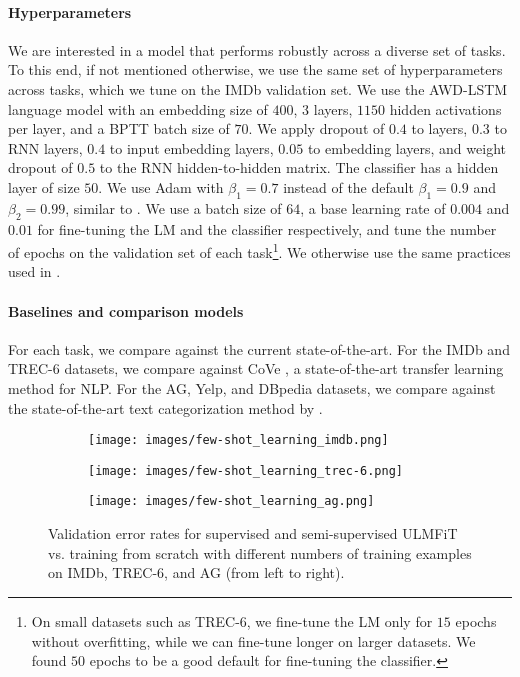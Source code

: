 \documentclass[11pt,a4paper]{article}
\begin{document}
\paragraph{Hyperparameters} We are interested in a model that performs robustly across a diverse set of tasks. To this end, if not mentioned otherwise, we use the same set of hyperparameters across tasks, which we tune on the IMDb validation set. We use the AWD-LSTM language model \cite{Merity2017} with an embedding size of $400$, $3$ layers, $1150$ hidden activations per layer, and a BPTT batch size of $70$. We apply dropout of $0.4$ to layers, $0.3$ to RNN layers, $0.4$ to input embedding layers, $0.05$ to embedding layers, and weight dropout of $0.5$ to the RNN hidden-to-hidden matrix. The classifier has a hidden layer of size $50$. We use Adam with $\beta_1=0.7$ instead of the default $\beta_1=0.9$ and $\beta_2 = 0.99$, similar to \cite{Dozat2017}. We use a batch size of $64$, a base learning rate of $0.004$ and $0.01$ for fine-tuning the LM and the classifier respectively, and tune the number of epochs on the validation set of each task\footnote{On small datasets such as TREC-6, we fine-tune the LM only for $15$ epochs without overfitting, while we can fine-tune longer on larger datasets. We found $50$ epochs to be a good default for fine-tuning the classifier.}. We otherwise use the same practices used in \cite{Merity2017}.

\paragraph{Baselines and comparison models} For each task, we compare against the current state-of-the-art. For the IMDb and TREC-6 datasets, we compare against CoVe \cite{Mccann2017}, a state-of-the-art transfer learning method for NLP. For the AG, Yelp, and DBpedia datasets, we compare against the state-of-the-art text categorization method by .

\begin{figure*}[!htb]
    \begin{subfigure}{.31\linewidth}
      \centering
         \texttt{[image: images/few-shot\_learning\_imdb.png]}
    \end{subfigure}\hspace*{0.3cm}
    \begin{subfigure}{.31\linewidth}
      \centering
         \texttt{[image: images/few-shot\_learning\_trec-6.png]}
    \end{subfigure}
    \hspace*{0.3cm}
    \begin{subfigure}{.31\linewidth}
      \centering
         \texttt{[image: images/few-shot\_learning\_ag.png]}
    \end{subfigure}
    \caption{Validation error rates for supervised and semi-supervised ULMFiT vs. training from scratch with different numbers of training examples on IMDb, TREC-6, and AG (from left to right).}
\label{fig:few-shot_learning}
\end{figure*}
\end{document}
